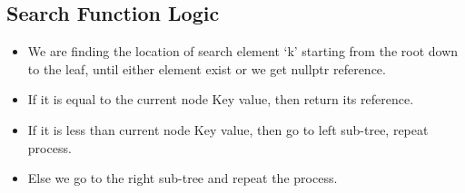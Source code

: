 \documentclass{article}
\begin{document}
\subsection{Search Function Logic}
\begin{itemize}
	\item We are finding the location of search element `k' starting from the root down to the leaf, until either element exist or we get nullptr reference.
	\item If it is equal to the current node Key value, then return its reference.
	\item If it is less than current node Key value, then go to left sub-tree, repeat process.
	\item Else we go to the right sub-tree and repeat the process.
\end{itemize}
\end{document}
